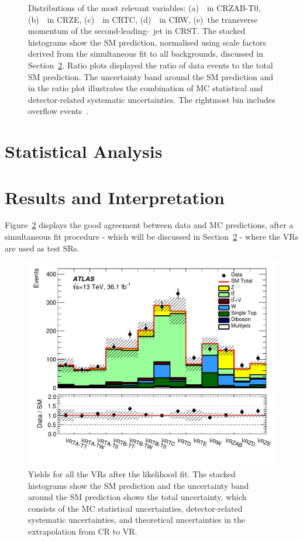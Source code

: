 \begin{figure}[!htb]
		    \caption{Distributions of the most relevant variables: (a)~\mttwoprime\ in CRZAB-T0, (b)~\metprime\ in CRZE, (c)~\rISR\ in CRTC, (d)~\mtbmax\ in CRW, (e)~the transverse momentum of the second-leading-\pT\ jet in CRST. The stacked histograms show the \ac{SM} prediction, normalised using scale factors derived from the simultaneous fit to all backgrounds, discussed in Section~\ref{sec:results}. Ratio plots displayed the ratio of data events to the total \ac{SM} prediction. The uncertainty band around the \ac{SM} prediction and in the ratio plot illustrates the combination of \ac{MC} statistical and detector-related systematic uncertainties. The rightmost bin includes overflow events~\cite{stop0L}.}
		    \label{fig:CRs}
		\end{figure}



	
	\section{Statistical Analysis}

		



	\section{Results and Interpretation}
	\label{sec:results}
 		Figure~\ref{fig:VRs} displays the good agreement between data and \ac{MC} predictions, after a simultaneous fit procedure - which will be discussed in Section~\ref{sec:results} - where the \acp{VR} are used as test \acp{SR}.

		\begin{figure}[!hbt]
		  \begin{center}
		    \includegraphics[width=.8\textwidth]{figures/stop/regionSummaryVR}
		    \caption{Yields for all the \acp{VR} after the likelihood fit. The stacked histograms show the \ac{SM} prediction and the uncertainty band around the \ac{SM} prediction shows the total uncertainty, which consists of the \ac{MC} statistical uncertainties, detector-related systematic uncertainties, and theoretical uncertainties in the extrapolation from \ac{CR} to \ac{VR}.} 
		    \label{fig:VRs}
		  \end{center}
		\end{figure}

